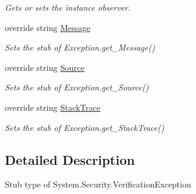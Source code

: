 \begin{DoxyCompactItemize}
\begin{DoxyCompactList}\small\item\em Gets or sets the instance observer.\end{DoxyCompactList}\item 
override string \hyperlink{class_system_1_1_security_1_1_fakes_1_1_stub_verification_exception_a04a996cfffcbdfc60cefe64a78f518f5}{Message}
\begin{DoxyCompactList}\small\item\em Sets the stub of Exception.\-get\-\_\-\-Message()\end{DoxyCompactList}\item 
override string \hyperlink{class_system_1_1_security_1_1_fakes_1_1_stub_verification_exception_a7ce5943c9265918e5ab2b65a3f3fbd2f}{Source}
\begin{DoxyCompactList}\small\item\em Sets the stub of Exception.\-get\-\_\-\-Source()\end{DoxyCompactList}\item 
override string \hyperlink{class_system_1_1_security_1_1_fakes_1_1_stub_verification_exception_aaf6b75e660af14f9909b1c696e88abe8}{Stack\-Trace}
\begin{DoxyCompactList}\small\item\em Sets the stub of Exception.\-get\-\_\-\-Stack\-Trace()\end{DoxyCompactList}\end{DoxyCompactItemize}


\subsection{Detailed Description}
Stub type of System.\-Security.\-Verification\-Exception



